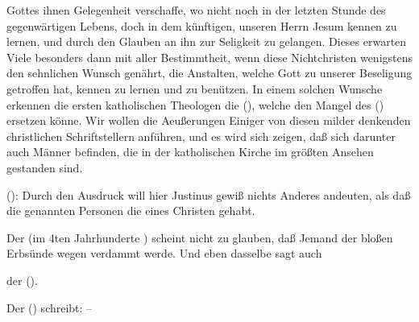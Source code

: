 \begin{aufza}
Gottes ihnen Gelegenheit verschaffe, wo nicht noch in der letzten Stunde des gegenwärtigen Lebens, doch in dem künftigen, unseren Herrn Jesum kennen zu lernen, und durch den Glauben an ihn zur Seligkeit zu gelangen. Dieses erwarten Viele besonders dann mit aller Bestimmtheit, wenn diese Nichtchristen wenigstens den sehnlichen Wunsch genährt, die Anstalten, welche Gott zu unserer Beseligung getroffen hat, kennen zu lernen und zu benützen. In einem solchen Wunsche erkennen die ersten katholischen Theologen die  (), welche den Mangel des  () ersetzen könne. Wir wollen die Aeußerungen Einiger von diesen milder denkenden christlichen Schriftstellern anführen, und es wird sich zeigen, daß sich darunter auch Männer befinden, die in der katholischen Kirche im größten Ansehen gestanden sind.
\begin{aufzc}
\item {} ():  Durch den Ausdruck  will hier Justinus gewiß nichts Anderes andeuten, als daß die genannten Personen die  eines Christen gehabt.
\item Der  (im 4ten Jahrhunderte ) scheint nicht zu glauben, daß Jemand der bloßen Erbsünde wegen verdammt werde. Und eben dasselbe sagt auch 
\item der  ().
\item Der  () schreibt:  --

\end{aufzc}
\end{aufza}
